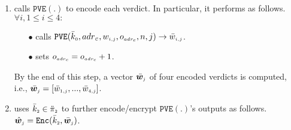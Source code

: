 \begin{enumerate}[leftmargin=.46cm]
\begin{enumerate}
\begin{enumerate}

\item calls $\mathtt{PVE}(.)$ to encode each verdict. In particular, it performs as follows. $\forall i, 1\leq i \leq 4:$
\begin{enumerate}
%

\item[$\bullet$] calls $\mathtt{PVE}(\bar{k}_{\scriptscriptstyle 0}, adr_{\scriptscriptstyle\mathcal{C}},  w_{\scriptscriptstyle i, j}, o_{\scriptscriptstyle adr_{\scriptscriptstyle{c}}}, n,  j)\rightarrow  \bar{  w}_{\scriptscriptstyle i,j}$.%
\item[$\bullet$] sets $o_{\scriptscriptstyle adr_{\scriptscriptstyle{c}}}=o_{\scriptscriptstyle adr_{\scriptscriptstyle{c}}}+1$.

%
%
\end{enumerate}
By the end of this step, a vector ${\bar {\bm w}}_{\scriptscriptstyle j}$ of four encoded verdicts is computed, i.e., $\bar {\bm w}_{\scriptscriptstyle j}=[ \bar{  w}_{\scriptscriptstyle 1,j},..., \bar{  w}_{\scriptscriptstyle 4,j}]$.
%
\item uses $\bar k_{\scriptscriptstyle 2}\in \ddot \pi_{\scriptscriptstyle 2}$ to further encode/encrypt  $\mathtt{PVE}(.)$'s outputs as follows. %
%
$ \hat {\bm w}_{\scriptscriptstyle j}= \mathtt{Enc}(\bar k_{\scriptscriptstyle 2}, \bar{\bm w}_{\scriptscriptstyle j})$.


%
%
%
%
%
\end{enumerate}



\end{enumerate}
\end{enumerate}

